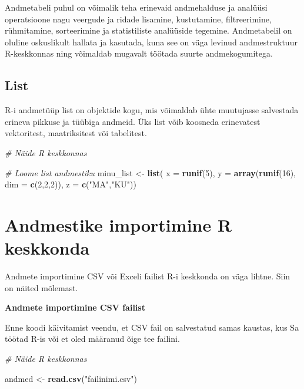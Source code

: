 \documentclass[
]{book}
\newenvironment{Shaded}{\begin{snugshade}}{\end{snugshade}}
\newcommand{\AttributeTok}[1]{\textcolor[rgb]{0.13,0.29,0.53}{#1}}
\newcommand{\CommentTok}[1]{\textcolor[rgb]{0.56,0.35,0.01}{\textit{#1}}}
\newcommand{\DecValTok}[1]{\textcolor[rgb]{0.00,0.00,0.81}{#1}}
\newcommand{\FunctionTok}[1]{\textcolor[rgb]{0.13,0.29,0.53}{\textbf{#1}}}
\newcommand{\NormalTok}[1]{#1}
\newcommand{\OtherTok}[1]{\textcolor[rgb]{0.56,0.35,0.01}{#1}}
\newcommand{\StringTok}[1]{\textcolor[rgb]{0.31,0.60,0.02}{#1}}
\renewenvironment{Shaded} {\begin{snugshade}\footnotesize} {\end{snugshade}}
\begin{document}
Andmetabeli puhul on võimalik teha erinevaid andmehalduse ja analüüsi operatsioone nagu veergude ja ridade lisamine, kustutamine, filtreerimine, rühmitamine, sorteerimine ja statistiliste analüüside tegemine. Andmetabelil on oluline oskuslikult hallata ja kasutada, kuna see on väga levinud andmestruktuur R-keskkonnas ning võimaldab mugavalt töötada suurte andmekogumitega.

\subsection{List}\label{list}

R-i andmetüüp list on objektide kogu, mis võimaldab ühte muutujasse salvestada erineva pikkuse ja tüübiga andmeid. Üks list võib koosneda erinevatest vektoritest, maatriksitest või tabelitest.

\begin{Shaded}
\begin{Highlighting}[]
\CommentTok{\# Näide R keskkonnas}

\CommentTok{\# Loome list andmestiku}
\NormalTok{minu\_list }\OtherTok{\textless{}{-}} \FunctionTok{list}\NormalTok{(}
  \AttributeTok{x =} \FunctionTok{runif}\NormalTok{(}\DecValTok{5}\NormalTok{), }
  \AttributeTok{y =} \FunctionTok{array}\NormalTok{(}\FunctionTok{runif}\NormalTok{(}\DecValTok{16}\NormalTok{), }\AttributeTok{dim =} \FunctionTok{c}\NormalTok{(}\DecValTok{2}\NormalTok{,}\DecValTok{2}\NormalTok{,}\DecValTok{2}\NormalTok{)), }
  \AttributeTok{z =} \FunctionTok{c}\NormalTok{(}\StringTok{"MA"}\NormalTok{,}\StringTok{"KU"}\NormalTok{))}
\end{Highlighting}
\end{Shaded}

\section{Andmestike importimine R keskkonda}\label{andmestike-importimine-r-keskkonda}

Andmete importimine CSV või Exceli failist R-i keskkonda on väga lihtne. Siin on näited mõlemast.

\textbf{Andmete importimine CSV failist}

Enne koodi käivitamist veendu, et CSV fail on salvestatud samas kaustas, kus Sa töötad R-is või et oled määranud õige tee failini.

\begin{Shaded}
\begin{Highlighting}[]
\CommentTok{\# Näide R keskkonnas}

\NormalTok{andmed }\OtherTok{\textless{}{-}} \FunctionTok{read.csv}\NormalTok{(}\StringTok{"failinimi.csv"}\NormalTok{)}
\end{Highlighting}
\end{Shaded}
\end{document}
